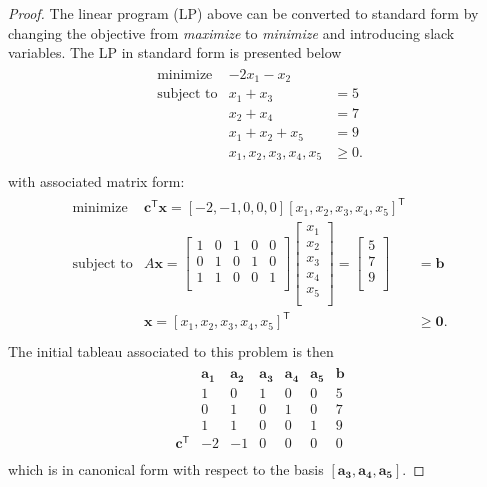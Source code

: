\documentclass[12pt]{article}
\theoremstyle{definition}
\newcommand{\vect}[1]{\boldsymbol{#1}}
\newcommand{\tran}{\mathsf{T}}
\begin{document}
\begin{proof}
  The linear program (LP) above can be converted to standard form by changing the
  objective from \textit{maximize} to \textit{minimize} and introducing
  slack variables. The LP in standard form is presented below
  \begin{align*}
    \begin{array}{rrl}
      \text{minimize} & -2x_1 - x_2 & \\
      \text{subject to} & x_1 + x_3 &= 5 \\
      & x_2 + x_4 &= 7 \\
      & x_1 + x_2 + x_5 &= 9 \\
      & x_1, x_2, x_3, x_4, x_5 &\geq 0.  \\
    \end{array}
  \end{align*}
  with associated matrix form:
  \begin{align*}
    \begin{array}{rrl}
      \text{minimize} & \vect{c}^\tran\vect{x} = [-2, -1, 0, 0, 0][x_1, x_2, x_3, x_4, x_5]^\tran & \\
      \text{subject to} & A\vect{x} =
      \begin{bmatrix}
        1 & 0 & 1 & 0 & 0 \\
        0 & 1 & 0 & 1 & 0 \\
        1 & 1 & 0 & 0 & 1 \\
      \end{bmatrix}
      \begin{bmatrix}
        x_1 \\
        x_2 \\
        x_3 \\
        x_4 \\
        x_5\\
      \end{bmatrix}
      =
      \begin{bmatrix}
        5 \\
        7 \\
        9 \\
      \end{bmatrix}
      &= \vect{b}
      \\
      &\vect{x} = [x_1, x_2, x_3, x_4, x_5]^\tran &\geq \vect{0}.\\
    \end{array}
  \end{align*}
  The initial tableau associated to this problem is then
  \begin{align*}
    \begin{matrix}
      & \vect{a_1} & \vect{a_2} & \vect{a_3} & \vect{a_4} & \vect{a_5} & \vect{b} \\
      & 1 & 0 & 1 & 0 & 0 & 5 \\
      & 0 & 1 & 0 & 1 & 0 & 7 \\
      & 1 & 1 & 0 & 0 & 1 & 9 \\
      \vect{c}^\tran & -2 & -1  & 0 & 0 & 0 & 0 \\
    \end{matrix}
  \end{align*}
  which is in canonical form with respect to the basis $[\vect{a_3}, \vect{a_4}, \vect{a_5}]$.


\end{proof}
\end{document}
